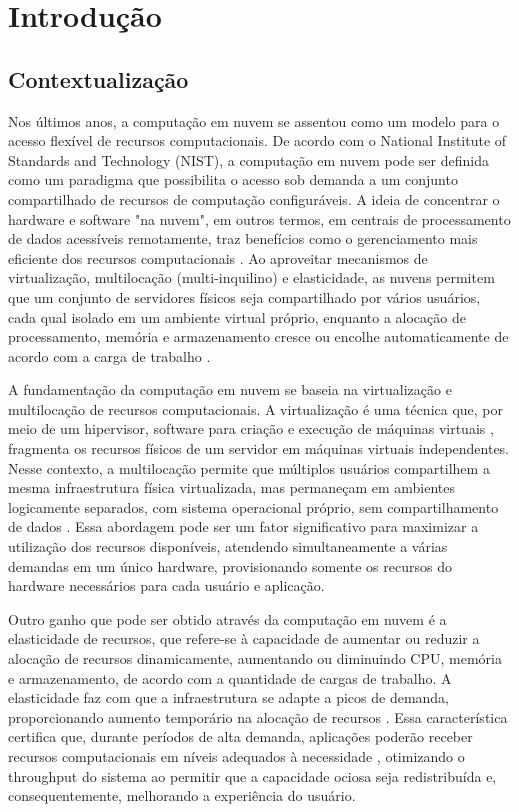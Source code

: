 \chapter{Introdução}


\section{Contextualização}

Nos últimos anos, a computação em nuvem se assentou como um modelo para o acesso flexível de recursos computacionais. De acordo com o National Institute of Standards and Technology (NIST), a computação em nuvem pode ser definida como um paradigma que possibilita o acesso sob demanda a um conjunto compartilhado de recursos de computação configuráveis. A ideia de concentrar o hardware e software "na nuvem", em outros termos, em centrais de processamento de dados acessíveis remotamente, traz benefícios como o gerenciamento mais eficiente dos recursos computacionais \cite{mell2011}. Ao aproveitar mecanismos de virtualização, multilocação (multi-inquilino) e elasticidade, as nuvens permitem que um conjunto de servidores físicos seja compartilhado por vários usuários, cada qual isolado em um ambiente virtual próprio, enquanto a alocação de processamento, memória e armazenamento cresce ou encolhe automaticamente de acordo com a carga de trabalho \cite{dai2015, ray2013}. 

A fundamentação da computação em nuvem se baseia na virtualização e multilocação de recursos computacionais. A virtualização é uma técnica que, por meio de um hipervisor, software para criação e execução de máquinas virtuais \cite{kivity2007kvm}, fragmenta os recursos físicos de um servidor em  máquinas virtuais independentes. Nesse contexto, a multilocação permite que múltiplos usuários compartilhem a mesma infraestrutura física virtualizada, mas permaneçam em ambientes logicamente separados, com sistema operacional próprio, sem compartilhamento de dados \cite{heuchert2021}. Essa abordagem pode ser um fator significativo para maximizar a utilização dos recursos disponíveis, atendendo simultaneamente a várias demandas em um único hardware, provisionando somente os recursos do hardware necessários para cada usuário e aplicação.

Outro ganho que pode ser obtido através da computação em nuvem é a elasticidade de recursos, que refere-se à capacidade de aumentar ou reduzir a alocação de recursos dinamicamente, aumentando ou diminuindo CPU, memória e armazenamento, de acordo com a quantidade de cargas de trabalho. A elasticidade faz com que a infraestrutura se adapte a picos de demanda, proporcionando aumento temporário na alocação de recursos \cite{armbrust2010}. Essa característica certifica que, durante períodos de alta demanda, aplicações poderão receber recursos computacionais em níveis adequados à necessidade \cite{oliveira2015}, otimizando o throughput do sistema ao permitir que a capacidade ociosa seja redistribuída e, consequentemente, melhorando a experiência do usuário.

